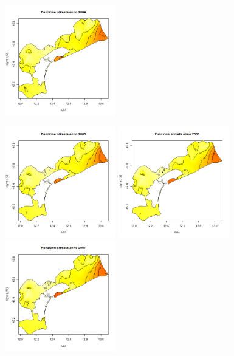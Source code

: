 \documentclass[a4paper,11pt,twoside,openright]{book}							%
\begin{document}
\begin{figure}[H]
	\includegraphics[width=0.43\textwidth ,height=0.235\textheight]{Immagini/venezia_con_covariate/Anno2004.png}
\end{figure}
\newpage
\begin{figure}[H]
	\centering
	\includegraphics[width=0.43\textwidth ,height=0.235\textheight]{Immagini/venezia_con_covariate/Anno2005.png}
	\includegraphics[width=0.43\textwidth ,height=0.235\textheight]{Immagini/venezia_con_covariate/Anno2006.png}
	\includegraphics[width=0.43\textwidth ,height=0.235\textheight]{Immagini/venezia_con_covariate/Anno2007.png}

\end{figure}
\end{document}
